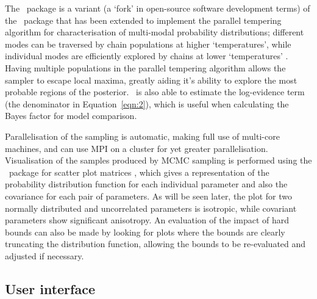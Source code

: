 \documentclass[pdf,preprint]{article}
\begin{document}
The \ptemcee\ package is a variant (a `fork' in open-source software development terms) of the \emcee\ package that has been extended to implement the parallel tempering algorithm for characterisation of multi-modal probability distributions; different modes can be traversed by chain populations at higher `temperatures', while individual modes are efficiently explored by chains at lower `temperatures' \cite{ptemcee}.  Having multiple populations in the parallel tempering algorithm allows the sampler to escape local maxima, greatly aiding it's ability to explore the most probable regions of the posterior.  \ptemcee\ is also able to estimate the log-evidence term (the denominator in Equation~\ref{eqn:2}), which is useful when calculating the Bayes factor for model comparison.

Parallelisation of the sampling is automatic, making full use of multi-core machines, and can use MPI on a cluster for yet greater parallelisation. Visualisation of the samples produced by MCMC sampling is performed using the \corner\ package for scatter plot matrices \cite{corner}, which gives a representation of the probability distribution function for each individual parameter and also the covariance for each pair of parameters. As will be seen later, the plot for two normally distributed and uncorrelated parameters is isotropic, while covariant parameters show significant anisotropy. An evaluation of the impact of hard bounds can also be made by looking for plots where the bounds are clearly truncating the distribution function, allowing the bounds to be re-evaluated and adjusted if necessary.

\subsection{User interface}
\end{document}

